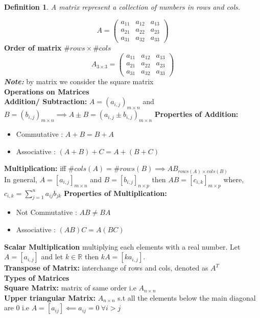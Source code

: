 \documentclass[12pt]{article}
\newcommand{\R}{\mathbb{R}}
\newtheorem*{defn}{Definition}
\begin{document}
\begin{defn}\normalfont
	A matrix represent a collection of numbers in rows and cols.
\end{defn}
$$ 
A = \begin{pmatrix}
	a_{11} & a_{12} & a_{13} \\
	a_{21} & a_{22} & a_{23} \\
	a_{31} & a_{32} & a_{33} 
\end{pmatrix} 
$$
\textbf{Order of matrix} $\#rows \times \#cols$
$$ 
A_{3\times 3} = \begin{pmatrix}
a_{11} & a_{12} & a_{13} \\
a_{21} & a_{22} & a_{23} \\
a_{31} & a_{32} & a_{33} 
\end{pmatrix}
$$
\textbf{\textit{Note:}} by matrix we consider the square matrix \\
\textbf{Operations on Matrices}\\
\textbf{Addition/ Subtraction:} $A=(a_{i,j})_{m\times n}$ and $B=(b_{i,j})_{m\times n} \implies A\pm B = (a_{i,j} \pm b_{i,j})_{m\times n} $
\textbf{Properties of Addition:}
\begin{itemize}
	\item Commutative : $A+B=B+A$
	\item Associative : $(A+B)+C = A+(B+C)$
\end{itemize}
\textbf{Multiplication: } iff $\#cols(A)=\#rows(B) \implies AB_{rows(A)\times cols(B)}$\\
In general, $A=[a_{i,j}]_{m\times n}$ and  $B=[b_{i,j}]_{n\times p}$ then $AB=[c_{i,k}]_{m\times p}$ where, $c_{i,k} = \sum_{j=1}^{n} a_{ij}b_{jk}$ 
\textbf{Properties of Multiplication:}
\begin{itemize}
	\item Not Commutative : $AB\not=BA$
	\item Associative : $(AB)C = A(BC)$
\end{itemize}
\textbf{Scalar Multiplication} multiplying each elements with a real number. Let $A = [a_{i,j}]$ and let $k \in \R$ then $kA = [ka_{i,j}]$. \\
\textbf{Transpose of Matrix: }interchange of rows and cols, denoted as $A^T$ \\
\textbf{Types of Matrices}\\
\textbf{Square Matrix: } matrix of same order i.e $A_{n \times n}$\\
\textbf{Upper triangular Matrix: } $A_{n \times n}$ s.t all the elements below the main diagonal are $0$ i.e $A = [a_{ij}] \impliedby a_{ij}=0\: \forall i>j$\\
\end{document}
